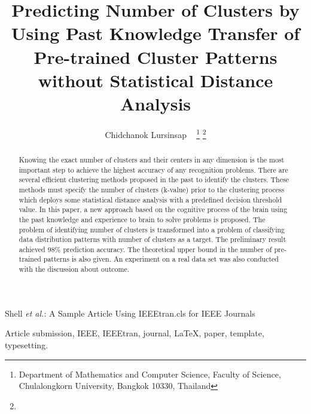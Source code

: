 \documentclass[lettersize,journal]{IEEEtran}
\begin{document}
\title{Predicting Number of Clusters by Using Past Knowledge Transfer of Pre-trained Cluster Patterns
without Statistical Distance Analysis}

\author{Chidchanok Lursinsap ~\IEEEmembership{}
\thanks{Department of Mathematics and Computer Science, Faculty of Science, Chulalongkorn University, 
Bangkok 10330, Thailand}%
\thanks{}}

%
{Shell \MakeLowercase{\textit{et al.}}: A Sample Article Using IEEEtran.cls for IEEE Journals}


\maketitle

\begin{abstract}
Knowing the exact number of clusters and their centers in any dimension is the most important step to 
achieve the highest accuracy of any recognition problems. There are several efficient clustering methods 
proposed in the past to identify the clusters. These methods must specify the number of 
clusters (k-value) prior to the clustering process which deploys some statistical distance analysis with a
predefined decision threshold value. In this paper, a new approach based on the cognitive process of
the brain using the past knowledge and experience to brain to solve problems is proposed. The problem of 
identifying number of clusters is transformed into a problem of classifying data distribution patterns
with number of clusters as a target. The preliminary result achieved 98\% prediction accuracy. The 
theoretical upper bound in the number of pre-trained patterns is also given. An experiment on a real 
data set was also conducted with the discussion about outcome. 

\end{abstract}

\begin{IEEEkeywords}
Article submission, IEEE, IEEEtran, journal, \LaTeX, paper, template, typesetting.
\end{IEEEkeywords}
\end{document}
